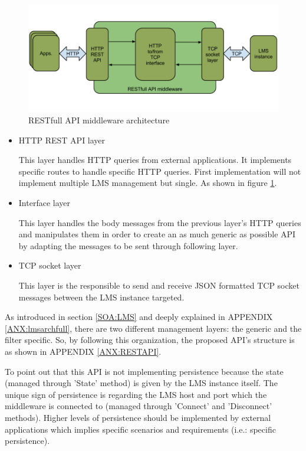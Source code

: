 \begin{figure}[!htb]
\begin{center}
\includegraphics[width=1\textwidth]{./images/RESTAPI.png}
\caption{RESTfull API middleware architecture}
\label{F:restAPI}
\end{center}
\end{figure}

\begin{itemize}
\item HTTP REST API layer \hfill

This layer handles HTTP queries from external applications. It implements specific routes to handle specific HTTP queries. First implementation will not implement multiple LMS management but single. As shown in figure \ref{F:restAPI}.

\item Interface layer \hfill

This layer handles the body messages from the previous layer's HTTP queries and manipulates them in order to create an as much generic as possible API by adapting the messages to be sent through following layer.

\item TCP socket layer \hfill

This layer is the responsible to send and receive JSON formatted TCP socket messages between the LMS instance targeted.
\end{itemize}

As introduced in section \ref{SOA:LMS} and deeply explained in APPENDIX \ref{ANX:lmsarchfull}, there are two different management layers: the generic and the filter specific. So, by following this organization, the proposed API's structure is as shown in APPENDIX \ref{ANX:RESTAPI}.

To point out that this API is not implementing persistence because the state (managed through 'State' method) is given by the LMS instance itself. The unique sign of persistence is regarding the LMS host and port which the middleware is connected to (managed through 'Connect' and 'Disconnect' methods). Higher levels of persistence should be implemented by external applications which implies specific scenarios and requirements (i.e.: specific persistence).

